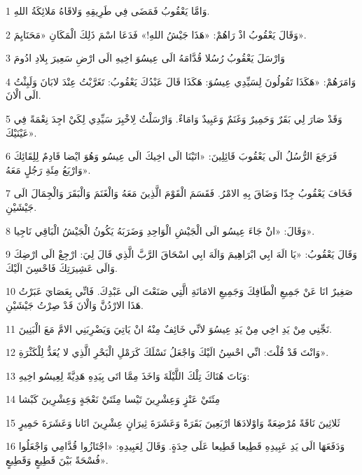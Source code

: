 \par 1 وَامَّا يَعْقُوبُ فَمَضَى فِي طَرِيقِهِ وَلاقَاهُ مَلائِكَةُ اللهِ.
\par 2 وَقَالَ يَعْقُوبُ اذْ رَاهُمْ: «هَذَا جَيْشُ اللهِ!» فَدَعَا اسْمَ ذَلِكَ الْمَكَانِ «مَحَنَايِمَ».
\par 3 وَارْسَلَ يَعْقُوبُ رُسُلا قُدَّامَهُ الَى عِيسُوَ اخِيهِ الَى ارْضِ سَعِيرَ بِلادِ ادُومَ
\par 4 وَامَرَهُمْ: «هَكَذَا تَقُولُونَ لِسَيِّدِي عِيسُوَ: هَكَذَا قَالَ عَبْدُكَ يَعْقُوبُ: تَغَرَّبْتُ عِنْدَ لابَانَ وَلَبِثْتُ الَى الْانَ.
\par 5 وَقَدْ صَارَ لِي بَقَرٌ وَحَمِيرٌ وَغَنَمٌ وَعَبِيدٌ وَامَاءٌ. وَارْسَلْتُ لِاخْبِرَ سَيِّدِي لِكَيْ اجِدَ نِعْمَةً فِي عَيْنَيْكَ».
\par 6 فَرَجَعَ الرُّسُلُ الَى يَعْقُوبَ قَائِلِينَ: «اتَيْنَا الَى اخِيكَ الَى عِيسُو وَهُوَ ايْضا قَادِمٌ لِلِقَائِكَ وَارْبَعُ مِئَةِ رَجُلٍ مَعَهُ».
\par 7 فَخَافَ يَعْقُوبُ جِدّا وَضَاقَ بِهِ الامْرُ. فَقَسَمَ الْقَوْمَ الَّذِينَ مَعَهُ وَالْغَنَمَ وَالْبَقَرَ وَالْجِمَالَ الَى جَيْشَيْنِ.
\par 8 وَقَالَ: «انْ جَاءَ عِيسُو الَى الْجَيْشِ الْوَاحِدِ وَضَرَبَهُ يَكُونُ الْجَيْشُ الْبَاقِي نَاجِيا».
\par 9 وَقَالَ يَعْقُوبُ: «يَا الَهَ ابِي ابْرَاهِيمَ وَالَهَ ابِي اسْحَاقَ الرَّبَّ الَّذِي قَالَ لِيَ: ارْجِعْ الَى ارْضِكَ وَالَى عَشِيرَتِكَ فَاحْسِنَ الَيْكَ.
\par 10 صَغِيرٌ انَا عَنْ جَمِيعِ الْطَافِكَ وَجَمِيعِ الامَانَةِ الَّتِي صَنَعْتَ الَى عَبْدِكَ. فَانِّي بِعَصَايَ عَبَرْتُ هَذَا الارْدُنَّ وَالْانَ قَدْ صِرْتُ جَيْشَيْنِ.
\par 11 نَجِّنِي مِنْ يَدِ اخِي مِنْ يَدِ عِيسُوَ لانِّي خَائِفٌ مِنْهُ انْ يَاتِيَ وَيَضْرِبَنِي الامَّ مَعَ الْبَنِينَ.
\par 12 وَانْتَ قَدْ قُلْتَ: انِّي احْسِنُ الَيْكَ وَاجْعَلُ نَسْلَكَ كَرَمْلِ الْبَحْرِ الَّذِي لا يُعَدُّ لِلْكَثْرَةِ».
\par 13 وَبَاتَ هُنَاكَ تِلْكَ اللَّيْلَةَ وَاخَذَ مِمَّا اتَى بِيَدِهِ هَدِيَّةً لِعِيسُو اخِيهِ:
\par 14 مِئَتَيْ عَنْزٍ وَعِشْرِينَ تَيْسا مِئَتَيْ نَعْجَةٍ وَعِشْرِينَ كَبْشا
\par 15 ثَلاثِينَ نَاقَةً مُرْضِعَةً وَاوْلادَهَا ارْبَعِينَ بَقَرَةً وَعَشَرَةَ ثِيرَانٍ عِشْرِينَ اتَانا وَعَشَرَةَ حَمِيرٍ
\par 16 وَدَفَعَهَا الَى يَدِ عَبِيدِهِ قَطِيعا قَطِيعا عَلَى حِدَةٍ. وَقَالَ لِعَبِيدِهِ: «اجْتَازُوا قُدَّامِي وَاجْعَلُوا فُسْحَةً بَيْنَ قَطِيعٍ وَقَطِيعٍ».
